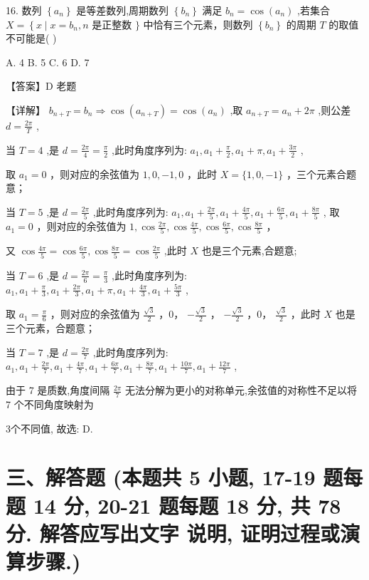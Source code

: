 \documentclass[10pt]{article}
\begin{document}
16. 数列 \(\left\{  {a}_{n}\right\}\) 是等差数列,周期数列 \(\left\{  {b}_{n}\right\}\) 满足 \({b}_{n} = \cos \left( {a}_{n}\right)\) ,若集合 \(X = \left\{  {x \mid  x = {b}_{n}}\right. ,n\) 是正整数 \(\}\) 中恰有三个元素，则数列 \(\left\{  {b}_{n}\right\}\) 的周期 \(T\) 的取值不可能是( )

A. 4 B. 5 C. 6 D. 7

【答案】D 老题

【详解】 \({b}_{n + T} = {b}_{n} \Rightarrow  \cos \left( {a}_{n + T}\right)  = \cos \left( {a}_{n}\right)\) ,取 \({a}_{n + T} = {a}_{n} + {2\pi }\) ,则公差 \(d = \frac{2\pi }{T}\) ,

当 \(T = 4\) ,是 \(d = \frac{2\pi }{4} = \frac{\pi }{2}\) ,此时角度序列为: \({a}_{1},{a}_{1} + \frac{\pi }{2},{a}_{1} + \pi ,{a}_{1} + \frac{3\pi }{2}\) ,

取 \({a}_{1} = 0\) ，则对应的余弦值为 \(1,0, - 1,0\) ，此时 \(X = \{ 1,0, - 1\}\) ，三个元素合题意；

当 \(T = 5\) ,是 \(d = \frac{2\pi }{5}\) ,此时角度序列为: \({a}_{1},{a}_{1} + \frac{2\pi }{5},{a}_{1} + \frac{4\pi }{5},{a}_{1} + \frac{6\pi }{5},{a}_{1} + \frac{8\pi }{5}\) , 取 \({a}_{1} = 0\) ，则对应的余弦值为 \(1,\cos \frac{2\pi }{5},\cos \frac{4\pi }{5},\cos \frac{6\pi }{5},\cos \frac{8\pi }{5}\) ，

又 \(\cos \frac{4\pi }{5} = \cos \frac{6\pi }{5},\cos \frac{8\pi }{5} = \cos \frac{2\pi }{5}\) ,此时 \(X\) 也是三个元素,合题意;

当 \(T = 6\) ,是 \(d = \frac{2\pi }{6} = \frac{\pi }{3}\) ,此时角度序列为: \({a}_{1},{a}_{1} + \frac{\pi }{3},{a}_{1} + \frac{2\pi }{3},{a}_{1} + \pi ,{a}_{1} + \frac{4\pi }{3},{a}_{1} + \frac{5\pi }{3}\) ,

取 \({a}_{1} = \frac{\pi }{6}\) ，则对应的余弦值为 \(\frac{\sqrt{3}}{2}\) ，0， \(- \frac{\sqrt{3}}{2}\) ， \(- \frac{\sqrt{3}}{2}\) ，0， \(\frac{\sqrt{3}}{2}\) ，此时 \(X\) 也是三个元素，合题意；

当 \(T = 7\) ,是 \(d = \frac{2\pi }{7}\) ,此时角度序列为: \({a}_{1},{a}_{1} + \frac{2\pi }{7},{a}_{1} + \frac{4\pi }{7},{a}_{1} + \frac{6\pi }{7},{a}_{1} + \frac{8\pi }{7},{a}_{1} + \frac{10\pi }{7},{a}_{1} + \frac{12\pi }{7}\) ,

由于 7 是质数,角度间隔 \(\frac{2\pi }{7}\) 无法分解为更小的对称单元,余弦值的对称性不足以将 7 个不同角度映射为

3个不同值, 故选: D.

\section*{三、解答题 (本题共 5 小题, 17-19 题每题 14 分, 20-21 题每题 18 分, 共 78 分. 解答应写出文字 说明, 证明过程或演算步骤.)}
\end{document}
